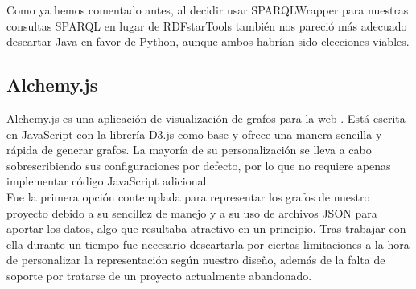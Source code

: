 Como ya hemos comentado antes, al decidir usar SPARQLWrapper para nuestras consultas SPARQL en lugar de RDFstarTools también nos pareció más adecuado descartar Java en favor de Python, aunque ambos habrían sido elecciones viables. 

\subsection*{Alchemy.js}

Alchemy.js es una aplicación de visualización de grafos para la web \cite{alchemyjs}. Está escrita en JavaScript con la librería D3.js como base y ofrece una manera sencilla y rápida de generar grafos. La mayoría de su personalización se lleva a cabo sobrescribiendo sus configuraciones por defecto, por lo que no requiere apenas implementar código JavaScript adicional.\\

Fue la primera opción contemplada para representar los grafos de nuestro proyecto debido a su sencillez de manejo y a su uso de archivos JSON para aportar los datos, algo que resultaba atractivo en un principio. Tras trabajar con ella durante un tiempo fue necesario descartarla por ciertas limitaciones a la hora de personalizar la representación según nuestro diseño, además de la falta de soporte por tratarse de un proyecto actualmente abandonado.
